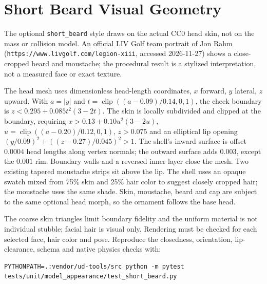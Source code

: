 \documentclass{article}
\begin{document}
\section*{Short Beard Visual Geometry}
The optional \texttt{short\_beard} style draws on the actual CC0 head skin,
not on the mass or collision model. An official LIV Golf team portrait of Jon
Rahm (\texttt{https://www.livgolf.com/legion-xiii}, accessed 2026-11-27)
shows a close-cropped beard and moustache; the procedural result is a stylized
interpretation, not a measured face or exact texture.

The head mesh uses dimensionless head-length coordinates, $x$ forward, $y$
lateral, $z$ upward. With $a=|y|$ and $t=\operatorname{clip}((a-0.09)/0.14,0,1)$,
the cheek boundary is $z<0.295+0.085t^2(3-2t)$. The skin is locally subdivided and clipped at the boundary, requiring
$x>0.13+0.10u^2(3-2u)$, $u=\operatorname{clip}((a-0.20)/0.12,0,1)$,
$z>0.075$ and an elliptical lip opening
$(y/0.09)^2+((z-0.27)/0.045)^2>1$. The shell's inward surface is offset
$0.0004$ head lengths along vertex normals; the outward surface adds $0.003$,
except the $0.001$ rim. Boundary walls and a reversed inner layer close the
mesh. Two existing tapered moustache strips sit above the lip. The shell uses an opaque swatch mixed from 75\% skin and 25\% hair color
to suggest closely cropped hair; the moustache uses the same shade. Skin, moustache, beard and cap are subject to
the same optional head morph, so the ornament follows the base head.

The coarse skin triangles limit boundary fidelity and the uniform material is
not individual stubble; facial hair is visual only. Rendering must be checked
for each selected face, hair color and pose. Reproduce the closedness,
orientation, lip-clearance, schema and native physics checks with:
\begin{verbatim}
PYTHONPATH=.:vendor/ud-tools/src python -m pytest tests/unit/model_appearance/test_short_beard.py
\end{verbatim}
\end{document}
